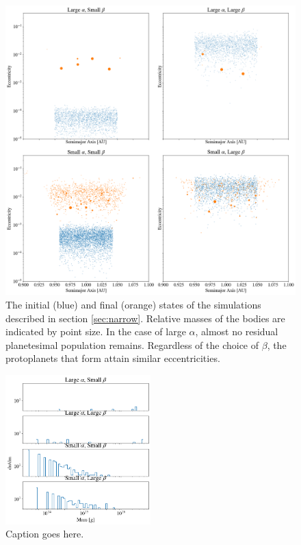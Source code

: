 \documentclass[twocolumn]{aastex63}
\begin{document}
\begin{figure}
\begin{center}
    \includegraphics[width=\textwidth]{figures/alpha_beta.png}
    \caption{The initial (blue) and final (orange) states of the simulations described in section \ref{sec:narrow}. Relative masses of the bodies are indicated by point size. In the case of large $\alpha$, almost no residual planetesimal population remains. Regardless of the choice of $\beta$, the protoplanets that form attain similar eccentricities. \label{fig:alpha_beta}}
\end{center}
\end{figure}

\begin{figure}
\begin{center}
    \includegraphics[width=0.5\textwidth]{figures/alpha_beta_mass.png}
    \caption{Caption goes here.\label{fig:alpha_beta_mass}}
\end{center}
\end{figure}
\end{document}
